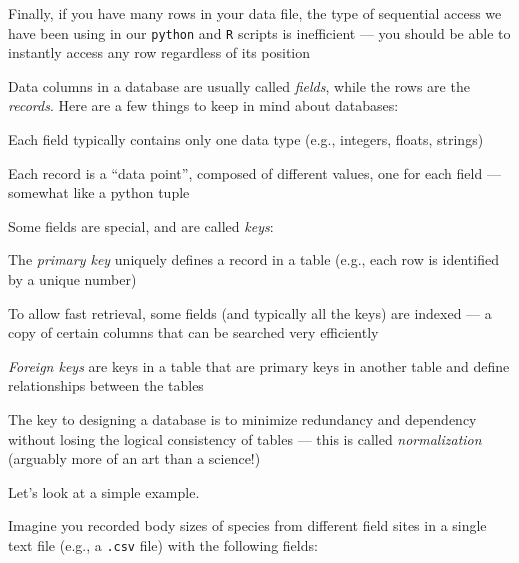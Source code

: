 Finally, if you have many rows in your data file, the type of 
sequential access we have been using in our {\tt python} and {\tt R} 
scripts is inefficient --- you should be able to instantly access any 
row regardless of its position

Data columns in a database are usually called {\it fields}, while the 
rows are the {\it records}. Here are a few things to keep in mind about 
databases:
 \begin{compactitem}
		\item Each field typically contains only one data type (e.g., 
			integers, floats, strings)
		\item Each record is a ``data point'', composed of different 
		values, one for each field --- somewhat like a python tuple
		\item Some fields are special, and are called {\it keys}:
      \begin{compactitem}
				\item The {\it primary key} uniquely defines a record in a 
				table (e.g., each row is identified by a unique number)
				\item To allow fast retrieval, some fields (and typically all the 
				keys) are indexed --- a copy of certain columns that can be searched 
				very efficiently 
				\item {\it Foreign keys} are keys in a table that are primary 
				keys in another table and define relationships between the 
				tables
      \end{compactitem}
		\item The key to designing a database is to minimize redundancy and 
		dependency without losing the logical consistency of tables --- 
		this is called {\it normalization} (arguably more of an art than a 
		science!)
\end{compactitem}

\noindent Let's look at a simple example. 

Imagine you recorded body 
sizes of species from different field sites in a single text file 
(e.g., a {\tt .csv} file) with the following fields:
  
